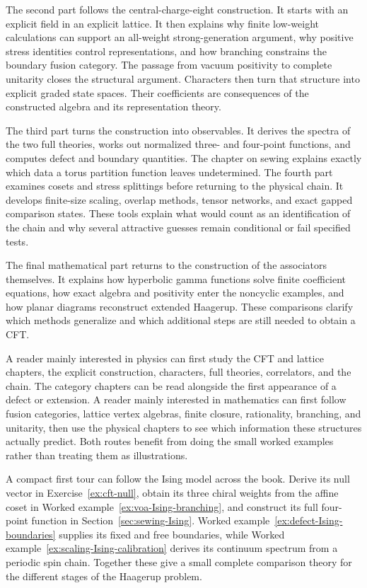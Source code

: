 The second part follows the central-charge-eight construction. It
starts with an explicit field in an explicit lattice. It then explains
why finite low-weight calculations can support an all-weight
strong-generation argument, why positive stress identities control
representations, and how branching constrains the boundary fusion
category. The passage from vacuum positivity to complete unitarity
closes the structural argument. Characters then turn that structure
into explicit graded state spaces. Their coefficients are consequences
of the constructed algebra and its representation theory.

The third part turns the construction into observables. It derives
the spectra of the two full theories, works out normalized three- and
four-point functions, and computes defect and boundary quantities.
The chapter on sewing explains exactly which data a torus partition
function leaves undetermined. The fourth part examines cosets and
stress splittings before returning to the physical chain. It develops
finite-size scaling, overlap methods, tensor networks, and exact
gapped comparison states. These tools explain what would count as an
identification of the chain and why several attractive guesses remain
conditional or fail specified tests.

The final mathematical part returns to the construction of the
associators themselves. It explains how hyperbolic gamma functions
solve finite coefficient equations, how exact algebra and positivity
enter the noncyclic examples, and how planar diagrams reconstruct
extended Haagerup. These comparisons clarify which methods generalize
and which additional steps are still needed to obtain a CFT.

A reader mainly interested in physics can first study the CFT and
lattice chapters, the explicit construction, characters, full theories,
correlators, and the chain. The category chapters can be read alongside
the first appearance of a defect or extension. A reader mainly
interested in mathematics can first follow fusion categories, lattice
vertex algebras, finite closure, rationality, branching, and unitarity,
then use the physical chapters to see which information these
structures actually predict. Both routes benefit from doing the small
worked examples rather than treating them as illustrations.

A compact first tour can follow the Ising model across the book.
Derive its null vector in Exercise~\ref{ex:cft-null}, obtain its
three chiral weights from the affine coset in Worked
example~\ref{ex:voa-Ising-branching}, and construct its full four-point
function in Section~\ref{sec:sewing-Ising}. Worked
example~\ref{ex:defect-Ising-boundaries} supplies its fixed and free
boundaries, while Worked example~\ref{ex:scaling-Ising-calibration}
derives its continuum spectrum from a periodic spin chain.
Together these give a small complete comparison theory for the
different stages of the Haagerup problem.

